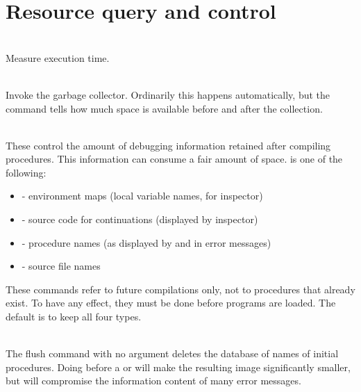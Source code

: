 \section{Resource query and control}
\label{resource-commands}

\begin{description}
\item {}\\
    Measure execution time.

\item {}\\
    Invoke the garbage collector.  Ordinarily this happens
    automatically, but the command tells how much space is available
    before and after the collection.

\item {}
\item {}\\
    These control the amount of debugging information retained after
    compiling procedures.  This information can consume a fair amount
    of space.   is one of the following:
\begin{itemize}
\item {} - environment maps (local variable names, for inspector)
\item {} - source code for continuations (displayed by inspector)
\item {} - procedure names (as displayed by  and in error
       messages)
\item {}  - source file names
\end{itemize}
    These commands refer to future compilations only, not to procedures
    that already exist.  To have any effect, they must be done before
    programs are loaded.  The default is to keep all four types.

\item {}\\
    The flush command with no argument deletes the database of names
    of initial procedures.  Doing  before a  or
    will make the resulting image significantly smaller, but will
    compromise the information content of many error
    messages.
\end{description}

